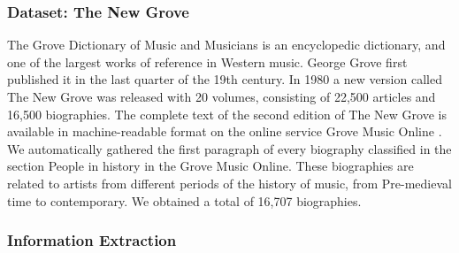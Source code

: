 

\subsubsection{Dataset: The New Grove}

The Grove Dictionary of Music and Musicians is an encyclopedic dictionary, and one of the largest works of reference in Western music. George Grove first published it in the last quarter of the 19th century. In 1980 a new version called The New Grove  was released with 20 volumes, consisting of 22,500 articles and 16,500 biographies. The complete text of the second edition of The New Grove is available in machine-readable format on the online service Grove Music Online .
We automatically gathered the first paragraph of every biography classified in the section People in history in the Grove Music Online. These biographies are related to artists from different periods of the history of music, from Pre-medieval time to contemporary. We obtained a total of 16,707 biographies.

\subsubsection{Information Extraction}

